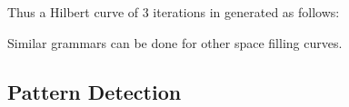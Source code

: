 Thus a Hilbert curve of 3 iterations in generated as follows:

Similar grammars can be done for other space filling curves.

\subsection{Pattern Detection}







